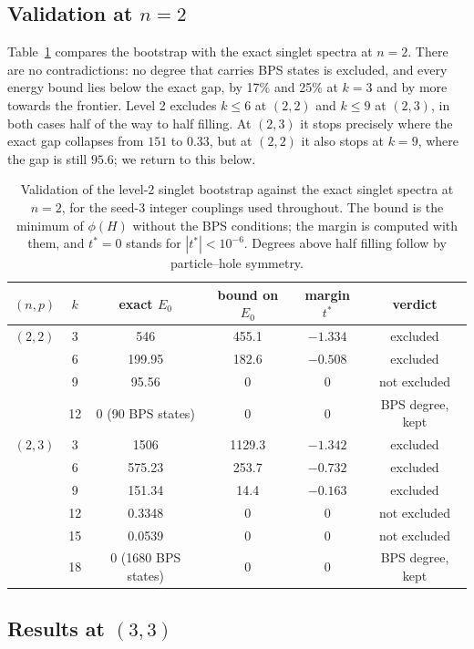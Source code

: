 \documentclass[10pt]{article}
\begin{document}
\subsection{\texorpdfstring{Validation at $n=2$}{Validation at n=2}}

Table~\ref{tab:bootn2} compares the bootstrap with the exact singlet spectra at $n=2$. There are no contradictions:
no degree that carries BPS states is excluded, and every energy bound lies below the exact gap, by 17\% and 25\% at
$k=3$ and by more towards the frontier. Level 2 excludes $k\le6$ at $(2,2)$ and $k\le9$ at $(2,3)$, in both cases
half of the way to half filling. At $(2,3)$ it stops precisely where the exact gap collapses from $151$ to $0.33$, but
at $(2,2)$ it also stops at $k=9$, where the gap is still $95.6$; we return to this below.

\begin{table}[t]\centering\small
\begin{tabular}{cccccc}
\toprule
$(n,p)$ & $k$ & exact $E_0$ & bound on $E_0$ & margin $t^*$ & verdict\\
\midrule
$(2,2)$ & 3 & 546 & 455.1 & $-1.334$ & excluded\\
 & 6 & 199.95 & 182.6 & $-0.508$ & excluded\\
 & 9 & 95.56 & 0 & 0 & not excluded\\
 & 12 & 0 (90 BPS states) & 0 & 0 & BPS degree, kept\\
\midrule
$(2,3)$ & 3 & 1506 & 1129.3 & $-1.342$ & excluded\\
 & 6 & 575.23 & 253.7 & $-0.732$ & excluded\\
 & 9 & 151.34 & 14.4 & $-0.163$ & excluded\\
 & 12 & 0.3348 & 0 & 0 & not excluded\\
 & 15 & 0.0539 & 0 & 0 & not excluded\\
 & 18 & 0 (1680 BPS states) & 0 & 0 & BPS degree, kept\\
\bottomrule
\end{tabular}
\caption{Validation of the level-2 singlet bootstrap against the exact singlet spectra at $n=2$, for the seed-3
integer couplings used throughout. The bound is the minimum of $\phi(H)$ without the BPS conditions; the margin is
computed with them, and $t^*=0$ stands for $|t^*|<10^{-6}$. Degrees above half filling follow by particle--hole
symmetry.}
\label{tab:bootn2}
\end{table}

\subsection{\texorpdfstring{Results at $(3,3)$}{Results at (3,3)}}
\end{document}
